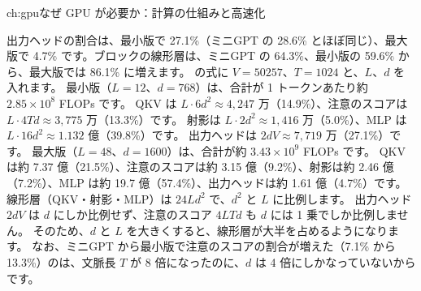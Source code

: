 \begin{answers}{ch:gpu}{なぜ GPU が必要か：計算の仕組みと高速化}
\item 出力ヘッドの割合は、最小版で 27.1\%（ミニGPT の 28.6\% とほぼ同じ）、最大版で 4.7\% です。ブロックの線形層は、ミニGPT の 64.3\%、最小版の 59.6\% から、最大版では 86.1\% に増えます。
の式に $V=50257$、$T=1024$ と、$L$、$d$ を入れます。
最小版（$L=12$、$d=768$）は、合計が 1 トークンあたり約 $2.85\times10^{8}$ FLOPs です。
QKV は $L\cdot6d^2\approx4{,}247$ 万（14.9\%）、注意のスコアは $L\cdot4Td\approx3{,}775$ 万（13.3\%）です。
射影は $L\cdot2d^2\approx1{,}416$ 万（5.0\%）、MLP は $L\cdot16d^2\approx1.132$ 億（39.8\%）です。
出力ヘッドは $2dV\approx7{,}719$ 万（27.1\%）です。
最大版（$L=48$、$d=1600$）は、合計が約 $3.43\times10^{9}$ FLOPs です。
QKV は約 7.37 億（21.5\%）、注意のスコアは約 3.15 億（9.2\%）、射影は約 2.46 億（7.2\%）、MLP は約 19.7 億（57.4\%）、出力ヘッドは約 1.61 億（4.7\%）です。
線形層（QKV・射影・MLP）は $24Ld^2$ で、$d^2$ と $L$ に比例します。
出力ヘッド $2dV$ は $d$ にしか比例せず、注意のスコア $4LTd$ も $d$ には 1 乗でしか比例しません。
そのため、$d$ と $L$ を大きくすると、線形層が大半を占めるようになります。
なお、ミニGPT から最小版で注意のスコアの割合が増えた（7.1\% から 13.3\%）のは、文脈長 $T$ が 8 倍になったのに、$d$ は 4 倍にしかなっていないからです。


\end{answers}
